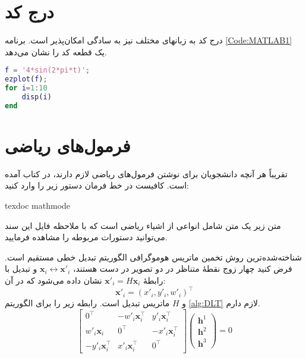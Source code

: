 \section{درج کد}
درج کد به زبانهای مختلف نیز به سادگی امکان‌پذیر است. برنامه 
\ref{Code:MATLAB1}
یک قطعه کد  را نشان می‌دهد.

\pagebreak
\begin{lstlisting}[language=MATLAB,breaklines=true,numbers=right, numberstyle=\footnotesize, numbersep=-10pt,  frame=single, breakatwhitespace=false, 
caption={نمونه کد \lr{MATLAB}},label={Code:MATLAB1}]
% define a continuous function
f = '4*sin(2*pi*t)';
ezplot(f);
for i=1:10
    disp(i)
end
\end{lstlisting}


\section{فرمول‌های ریاضی}
تقریباً هر آنچه دانشجویان برای نوشتن فرمول‌های ریاضی لازم دارند، در کتاب 
آمده است. کافیست در خط فرمان دستور زیر را وارد کنید:
\begin{latin}
texdoc mathmode
\end{latin}
متن زیر یک متن شامل انواعی از اشیاء ریاضی است که با ملاحظه فایل  این سند می‌توانید دستورات مربوطه را مشاهده فرمایید.

شناخته‌شده‌ترین روش تخمین ماتریس هوموگرافی الگوریتم تبدیل خطی مستقیم 
است.  فرض کنید چهار زوج نقطهٔ متناظر در دو تصویر در دست هستند،  $\mathbf{x}_i\leftrightarrow\mathbf{x}'_i$   و تبدیل با رابطهٔ
  $\mathbf{x}'_i = H\mathbf{x}_i$
  نشان داده می‌شود که در آن:
\[\mathbf{x}'_i=(x'_i,y'_i,w'_i)^\top  \]
و $H$ ماتریس تبدیل است.
رابطه زیر را برای الگوریتم  \eqref{alg:DLT} لازم دارم.
\begin{equation}\label{eq:DLT_Ah}
\left[
\begin{array}{ccc}
0^\top & -w'_i\mathbf{x}_i^\top & y'_i\mathbf{x}_i^\top \\ 
w'_i\mathbf{x}_i & 0^\top & -x'_i\mathbf{x}_i^\top \\ 
- y'_i\mathbf{x}_i^\top & x'_i\mathbf{x}_i^\top & 0^\top
\end{array} 
\right]
\left(
\begin{array}{c}
\mathbf{h}^1 \\ 
\mathbf{h}^2 \\ 
\mathbf{h}^3
\end{array} 
\right)=0
\end{equation}

